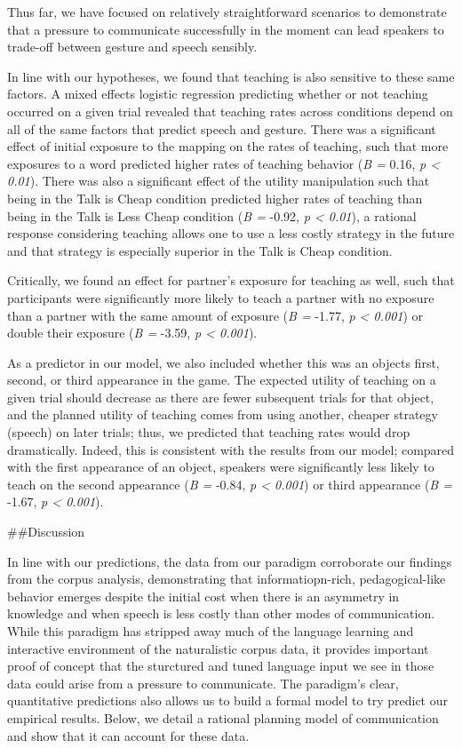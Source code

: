 \documentclass[10pt, letterpaper]{article}
\begin{document}
Thus far, we have focused on relatively straightforward scenarios to
demonstrate that a pressure to communicate successfully in the moment
can lead speakers to trade-off between gesture and speech sensibly.

In line with our hypotheses, we found that teaching is also sensitive to
these same factors. A mixed effects logistic regression predicting
whether or not teaching occurred on a given trial revealed that teaching
rates across conditions depend on all of the same factors that predict
speech and gesture. There was a significant effect of initial exposure
to the mapping on the rates of teaching, such that more exposures to a
word predicted higher rates of teaching behavior (\emph{B =} 0.16,
\emph{p \textless{} 0.01}). There was also a significant effect of the
utility manipulation such that being in the Talk is Cheap condition
predicted higher rates of teaching than being in the Talk is Less Cheap
condition (\emph{B =} -0.92, \emph{p \textless{} 0.01}), a rational
response considering teaching allows one to use a less costly strategy
in the future and that strategy is especially superior in the Talk is
Cheap condition.

Critically, we found an effect for partner's exposure for teaching as
well, such that participants were significantly more likely to teach a
partner with no exposure than a partner with the same amount of exposure
(\emph{B =} -1.77, \emph{p \textless{} 0.001}) or double their exposure
(\emph{B =} -3.59, \emph{p \textless{} 0.001}).

As a predictor in our model, we also included whether this was an
objects first, second, or third appearance in the game. The expected
utility of teaching on a given trial should decrease as there are fewer
subsequent trials for that object, and the planned utility of teaching
comes from using another, cheaper strategy (speech) on later trials;
thus, we predicted that teaching rates would drop dramatically. Indeed,
this is consistent with the results from our model; compared with the
first appearance of an object, speakers were significantly less likely
to teach on the second appearance (\emph{B =} -0.84, \emph{p \textless{}
0.001}) or third appearance (\emph{B =} -1.67, \emph{p \textless{}
0.001}).

\#\#Discussion

In line with our predictions, the data from our paradigm corroborate our
findings from the corpus analysis, demonstrating that informatiopn-rich,
pedagogical-like behavior emerges despite the initial cost when there is
an asymmetry in knowledge and when speech is less costly than other
modes of communication. While this paradigm has stripped away much of
the language learning and interactive environment of the naturalistic
corpus data, it provides important proof of concept that the sturctured
and tuned language input we see in those data could arise from a
pressure to communicate. The paradigm's clear, quantitative predictions
also allows us to build a formal model to try predict our empirical
results. Below, we detail a rational planning model of communication and
show that it can account for these data.
\end{document}
